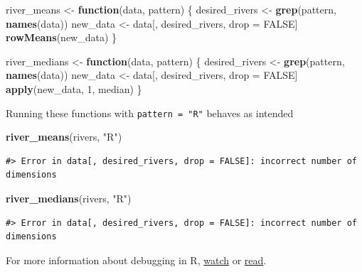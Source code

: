 \documentclass[
]{book}
\newenvironment{Shaded}{\begin{snugshade}}{\end{snugshade}}
\newcommand{\ControlFlowTok}[1]{\textcolor[rgb]{0.13,0.29,0.53}{\textbf{#1}}}
\newcommand{\DecValTok}[1]{\textcolor[rgb]{0.00,0.00,0.81}{#1}}
\newcommand{\KeywordTok}[1]{\textcolor[rgb]{0.13,0.29,0.53}{\textbf{#1}}}
\newcommand{\NormalTok}[1]{#1}
\newcommand{\OtherTok}[1]{\textcolor[rgb]{0.56,0.35,0.01}{#1}}
\newcommand{\StringTok}[1]{\textcolor[rgb]{0.31,0.60,0.02}{#1}}
\begin{document}
\begin{Shaded}
\begin{Highlighting}[]
\NormalTok{river_means <-}\StringTok{ }\ControlFlowTok{function}\NormalTok{(data, pattern) \{}
\NormalTok{  desired_rivers <-}\StringTok{ }\KeywordTok{grep}\NormalTok{(pattern, }\KeywordTok{names}\NormalTok{(data))}
\NormalTok{  new_data <-}\StringTok{ }\NormalTok{data[, desired_rivers, drop =}\StringTok{ }\OtherTok{FALSE}\NormalTok{]}
  \KeywordTok{rowMeans}\NormalTok{(new_data)}
\NormalTok{\}}

\NormalTok{river_medians <-}\StringTok{ }\ControlFlowTok{function}\NormalTok{(data, pattern) \{}
\NormalTok{  desired_rivers <-}\StringTok{ }\KeywordTok{grep}\NormalTok{(pattern, }\KeywordTok{names}\NormalTok{(data))}
\NormalTok{  new_data <-}\StringTok{ }\NormalTok{data[, desired_rivers, drop =}\StringTok{ }\OtherTok{FALSE}\NormalTok{]}
  \KeywordTok{apply}\NormalTok{(new_data, }\DecValTok{1}\NormalTok{, median)}
\NormalTok{\}}
\end{Highlighting}
\end{Shaded}

Running these functions with \texttt{pattern\ =\ "R"} behaves as intended

\begin{Shaded}
\begin{Highlighting}[]
\KeywordTok{river_means}\NormalTok{(rivers, }\StringTok{"R"}\NormalTok{)}
\end{Highlighting}
\end{Shaded}

\begin{verbatim}
#> Error in data[, desired_rivers, drop = FALSE]: incorrect number of dimensions
\end{verbatim}

\begin{Shaded}
\begin{Highlighting}[]
\KeywordTok{river_medians}\NormalTok{(rivers, }\StringTok{"R"}\NormalTok{)}
\end{Highlighting}
\end{Shaded}

\begin{verbatim}
#> Error in data[, desired_rivers, drop = FALSE]: incorrect number of dimensions
\end{verbatim}

For more information about debugging in R, \href{https://www.youtube.com/watch?v=vgYS-F8opgE}{watch} or \href{https://adv-r.hadley.nz/debugging.html}{read}.
\end{document}
